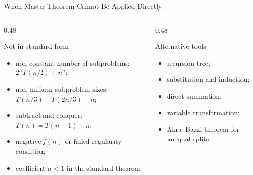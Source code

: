 \documentclass[aspectratio=169]{beamer}
\begin{document}
\begin{frame}{When Master Theorem Cannot Be Applied Directly}
  \small
  \begin{columns}[T]
    \begin{column}{0.48\textwidth}
      \begin{alertblock}{Not in standard form}
        \begin{itemize}
          \item non-constant number of subproblems: $2^nT(n/2)+n^n$;
          \item non-uniform subproblem sizes: $T(n/3)+T(2n/3)+n$;
          \item subtract-and-conquer: $T(n)=T(n-1)+n$;
          \item negative $f(n)$ or failed regularity condition;
          \item coefficient $a<1$ in the standard theorem.
        \end{itemize}
      \end{alertblock}
    \end{column}
    \begin{column}{0.48\textwidth}
      \begin{exampleblock}{Alternative tools}
        \begin{itemize}
          \item recursion tree;
          \item substitution and induction;
          \item direct summation;
          \item variable transformation;
          \item Akra--Bazzi theorem for unequal splits.
        \end{itemize}
      \end{exampleblock}
    \end{column}
  \end{columns}
\end{frame}
\end{document}
